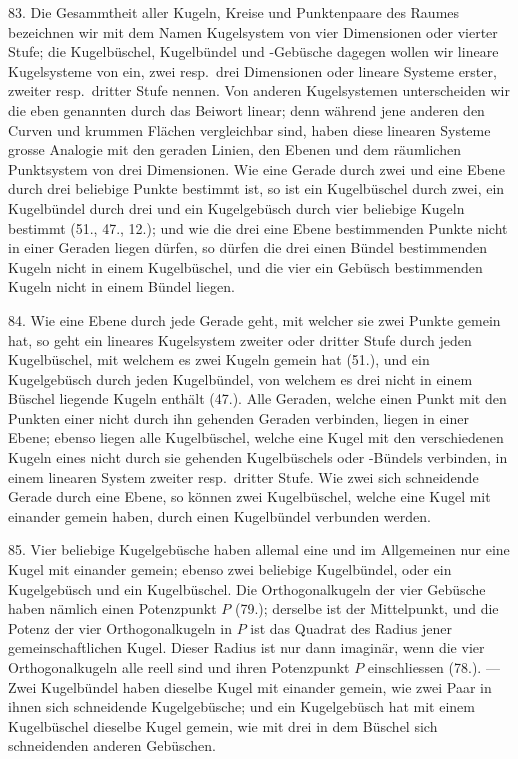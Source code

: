 \hspace{\parindent}%
83. Die Gesammtheit aller Kugeln, Kreise und Punktenpaare
des Raumes bezeichnen wir mit dem Namen {\glqq}Kugelsystem
von vier Dimensionen oder vierter Stufe{\grqq}; die Kugelb\"uschel,
Kugelb\"undel und -Geb\"usche dagegen wollen wir {\glqq}lineare
Kugelsysteme von ein, zwei resp.\ drei Dimensionen{\grqq}
oder {\glqq}lineare Systeme erster, zweiter resp.\ dritter Stufe{\grqq}
nennen. Von anderen Kugelsystemen unterscheiden wir die
eben genannten durch das Beiwort {\glqq}linear{\grqq}; denn w\"ahrend
jene anderen den Curven und krummen Fl\"achen vergleichbar
sind, haben diese linearen Systeme grosse Analogie mit
den geraden Linien, den Ebenen und dem r\"aumlichen Punktsystem
von drei Dimensionen. Wie eine Gerade durch zwei
und eine Ebene durch drei beliebige Punkte bestimmt ist,
so ist ein Kugelb\"uschel durch zwei, ein Kugelb\"undel durch
drei und ein Kugelgeb\"usch durch vier beliebige Kugeln bestimmt
(51., 47., 12.); und wie die drei eine Ebene bestimmenden
Punkte nicht in einer Geraden liegen d\"urfen, so
d\"urfen die drei einen B\"undel bestimmenden Kugeln nicht in
einem Kugelb\"uschel, und die vier ein Geb\"usch bestimmenden
Kugeln nicht in einem B\"undel liegen.

84. Wie eine Ebene durch jede Gerade geht, mit welcher
sie zwei Punkte gemein hat, so geht ein lineares Kugelsystem
zweiter oder dritter Stufe durch jeden Kugelb\"uschel,
mit welchem es zwei Kugeln gemein hat (51.), und ein Kugelgeb\"usch
durch jeden Kugelb\"undel, von welchem es drei
nicht in einem B\"uschel liegende Kugeln enth\"alt (47.). Alle
Geraden, welche einen Punkt mit den Punkten einer nicht
durch ihn gehenden Geraden verbinden, liegen in einer Ebene;
ebenso liegen alle Kugelb\"uschel, welche eine Kugel mit den
verschiedenen Kugeln eines nicht durch sie gehenden Kugelb\"uschels
oder -B\"undels verbinden, in einem linearen System
zweiter resp.\ dritter Stufe. Wie zwei sich schneidende Gerade
durch eine Ebene, so k\"onnen zwei Kugelb\"uschel, welche
eine Kugel mit einander gemein haben, durch einen Kugelb\"undel
verbunden werden.

85. Vier beliebige Kugelgeb\"usche haben allemal eine
und im Allgemeinen nur eine Kugel mit einander gemein;
ebenso zwei beliebige Kugelb\"undel, oder ein Kugelgeb\"usch
und ein Kugelb\"uschel. Die Orthogonalkugeln der vier Geb\"usche
haben n\"amlich einen Potenzpunkt $P$ (79.); derselbe
ist der Mittelpunkt, und die Potenz der vier Orthogonalkugeln
in $P$ ist das Quadrat des Radius jener gemeinschaftlichen
Kugel. Dieser Radius ist nur dann imagin\"ar, wenn
die vier Orthogonalkugeln alle reell sind und ihren Potenzpunkt
$P$ einschliessen (78.). --- Zwei Kugelb\"undel haben
dieselbe Kugel mit einander gemein, wie zwei Paar in ihnen
sich schneidende Kugelgeb\"usche; und ein Kugelgeb\"usch hat
mit einem Kugelb\"uschel dieselbe Kugel gemein, wie mit
drei in dem B\"uschel sich schneidenden anderen Geb\"uschen.

